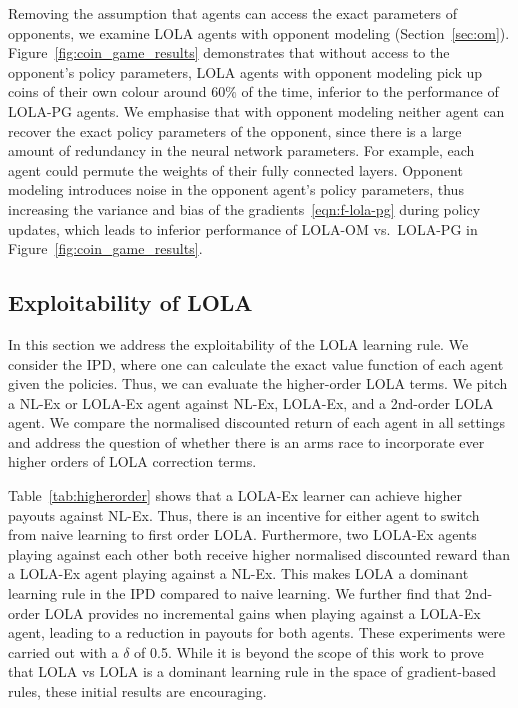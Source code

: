 Removing the assumption that agents can access the exact parameters of opponents, we examine LOLA agents with opponent modeling (Section~\ref{sec:om}). Figure~\ref{fig:coin_game_results} demonstrates that without access to the opponent's policy parameters, LOLA agents with opponent modeling pick up coins of their own colour around $60\%$ of the time, inferior to the performance of LOLA-PG agents. We emphasise that with opponent modeling neither agent can recover the exact policy parameters of the opponent, since  there is a large amount of redundancy in the neural network parameters. For example, each agent could permute the weights of their fully connected layers. Opponent modeling introduces noise in the opponent agent's policy parameters, thus increasing the variance and bias of the gradients~\eqref{eqn:f-lola-pg} during policy updates, which leads to inferior performance of LOLA-OM vs.\ LOLA-PG in Figure~\ref{fig:coin_game_results}.


\subsection{Exploitability of LOLA}
\label{subsec:higher-lola}
In this section we address the exploitability of the LOLA learning rule. We consider the IPD, where one can calculate the exact value function of each agent given the policies. Thus, we can evaluate the higher-order LOLA terms. We pitch a NL-Ex or LOLA-Ex agent against NL-Ex, LOLA-Ex, and a 2nd-order LOLA agent. We compare the normalised discounted return of each agent in all settings and address the question of whether there is an arms race to incorporate ever higher orders of LOLA correction terms. 

Table~\ref{tab:higherorder} shows that a LOLA-Ex learner can achieve higher payouts against NL-Ex. Thus, there is an incentive for either agent to switch from naive learning to first order LOLA. Furthermore, two LOLA-Ex agents playing against each other both receive higher normalised discounted reward than a LOLA-Ex agent playing against a NL-Ex. This makes LOLA a dominant learning rule in the IPD compared to naive learning. 
We further find that 2nd-order LOLA provides no incremental gains when playing against a LOLA-Ex agent, leading to a reduction in payouts for both agents. These experiments were carried out with a $\delta$ of 0.5. While it is beyond the scope of this work to prove that LOLA vs LOLA is a dominant learning rule in the space of gradient-based rules, these initial results are encouraging.

